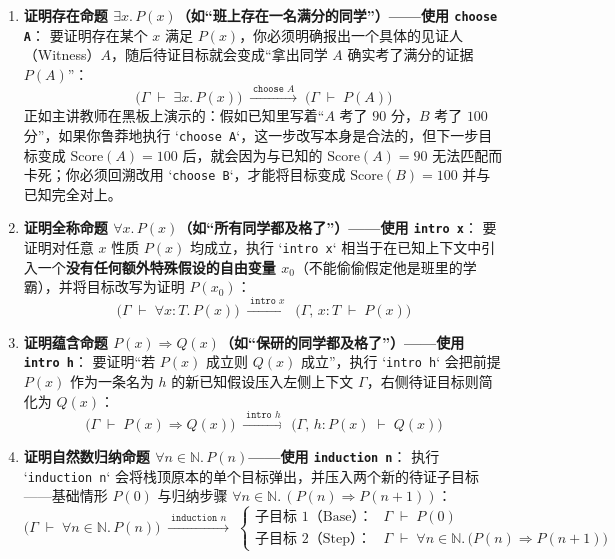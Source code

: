 \documentclass[a4paper]{article}
\begin{document}
\begin{enumerate}
    \item \textbf{证明存在命题 $\exists x.\, P(x)$（如“班上存在一名满分的同学”）——使用 \texttt{choose A}}：
    要证明存在某个 $x$ 满足 $P(x)$，你必须明确报出一个具体的见证人（Witness）$A$，随后待证目标就会变成“拿出同学 $A$ 确实考了满分的证据 $P(A)$”：
    \begin{equation}
    \big(\Gamma \;\vdash\; \exists x.\, P(x)\big) \;\xrightarrow{\;\texttt{choose } A\;}\; \big(\Gamma \;\vdash\; P(A)\big)
    \label{eq:tactic_choose}
    \end{equation}
    正如主讲教师在黑板上演示的：假如已知里写着“$A$ 考了 $90$ 分，$B$ 考了 $100$ 分”，如果你鲁莽地执行 `\texttt{choose A}`，这一步改写本身是合法的，但下一步目标变成 $\mathrm{Score}(A) = 100$ 后，就会因为与已知的 $\mathrm{Score}(A) = 90$ 无法匹配而卡死；你必须回溯改用 `\texttt{choose B}`，才能将目标变成 $\mathrm{Score}(B) = 100$ 并与已知完全对上。
    \item \textbf{证明全称命题 $\forall x.\, P(x)$（如“所有同学都及格了”）——使用 \texttt{intro x}}：
    要证明对任意 $x$ 性质 $P(x)$ 均成立，执行 `\texttt{intro x}` 相当于在已知上下文中引入一个\textbf{没有任何额外特殊假设的自由变量 $x_0$}（不能偷偷假定他是班里的学霸），并将目标改写为证明 $P(x_0)$：
    \begin{equation}
    \big(\Gamma \;\vdash\; \forall x: T.\, P(x)\big) \;\xrightarrow{\;\texttt{intro } x\;}\; \big(\Gamma,\, x: T \;\vdash\; P(x)\big)
    \label{eq:tactic_intro_forall}
    \end{equation}
    \item \textbf{证明蕴含命题 $P(x) \Rightarrow Q(x)$（如“保研的同学都及格了”）——使用 \texttt{intro h}}：
    要证明“若 $P(x)$ 成立则 $Q(x)$ 成立”，执行 `\texttt{intro h}` 会把前提 $P(x)$ 作为一条名为 $h$ 的新已知假设压入左侧上下文 $\Gamma$，右侧待证目标则简化为 $Q(x)$：
    \begin{equation}
    \big(\Gamma \;\vdash\; P(x) \Rightarrow Q(x)\big) \;\xrightarrow{\;\texttt{intro } h\;}\; \big(\Gamma,\, h: P(x) \;\vdash\; Q(x)\big)
    \label{eq:tactic_intro_imp}
    \end{equation}
    \item \textbf{证明自然数归纳命题 $\forall n \in \mathbb{N}.\, P(n)$——使用 \texttt{induction n}}：
    执行 `\texttt{induction n}` 会将栈顶原本的单个目标弹出，并压入两个新的待证子目标——基础情形 $P(0)$ 与归纳步骤 $\forall n \in \mathbb{N}.\, (P(n) \Rightarrow P(n+1))$：
    \begin{equation}
    \big(\Gamma \;\vdash\; \forall n \in \mathbb{N}.\, P(n)\big) \;\xrightarrow{\;\texttt{induction } n\;}\;
    \begin{cases}
    \text{子目标 1（Base）：} & \Gamma \;\vdash\; P(0) \\
    \text{子目标 2（Step）：} & \Gamma \;\vdash\; \forall n \in \mathbb{N}.\, \big(P(n) \Rightarrow P(n+1)\big)
    \end{cases}
    \label{eq:tactic_induction}
    \end{equation}
\end{enumerate}
\end{document}
